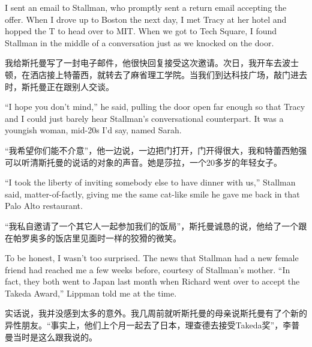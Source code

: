 \ifdefined\eng
I sent an email to Stallman, who promptly sent a return email accepting the offer. When I drove up to Boston the next day, I met Tracy at her hotel and hopped the T to head over to MIT. When we got to Tech Square, I found Stallman in the middle of a conversation just as we knocked on the door.
\fi

\ifdefined\chs
我给斯托曼写了一封电子邮件，他很快回复接受这次邀请。次日，我开车去波士顿，在洒店接上特蕾西，就转去了麻省理工学院。当我们到达科技广场，敲门进去时，斯托曼正在跟别人交谈。
\fi

\ifdefined\eng
``I hope you don't mind,'' he said, pulling the door open far enough so that Tracy and I could just barely hear Stallman's conversational counterpart. It was a youngish woman, mid-20s I'd say, named Sarah.
\fi

\ifdefined\chs
“我希望你们能不介意”，他一边说，一边把门打开，门开得很大，我和特蕾西勉强可以听清斯托曼的说话的对象的声音。她是莎拉，一个20多岁的年轻女子。
\fi

\ifdefined\eng
``I took the liberty of inviting somebody else to have dinner with us,'' Stallman said, matter-of-factly, giving me the same cat-like smile he gave me back in that Palo Alto restaurant.
\fi

\ifdefined\chs
“我私自邀请了一个其它人一起参加我们的饭局”，斯托曼诚恳的说，他给了一个跟在帕罗奥多的饭店里见面时一样的狡猾的微笑。
\fi

\ifdefined\eng
To be honest, I wasn't too surprised. The news that Stallman had a new female friend had reached me a few weeks before, courtesy of Stallman's mother. ``In fact, they both went to Japan last month when Richard went over to accept the Takeda Award,'' Lippman told me at the time.
\fi

\ifdefined\chs
实话说，我并没感到太多的意外。我几周前就听斯托曼的母亲说斯托曼有了个新的异性朋友。“事实上，他们上个月一起去了日本，理查德去接受Takeda奖”，李普曼当时是这么跟我说的。
\fi

